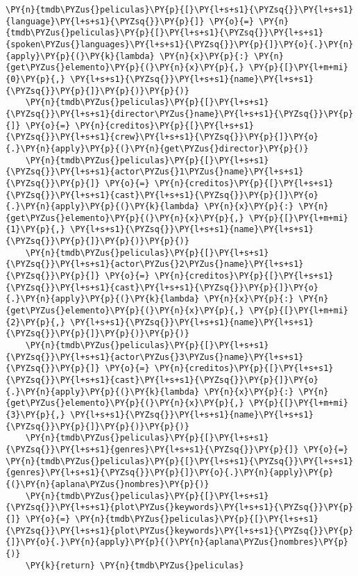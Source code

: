 \begin{tcolorbox}[breakable, size=fbox, boxrule=1pt, pad at break*=1mm,colback=cellbackground, colframe=cellborder]
\begin{Verbatim}[commandchars=\\\{\}]
    \PY{n}{tmdb\PYZus{}peliculas}\PY{p}{[}\PY{l+s+s1}{\PYZsq{}}\PY{l+s+s1}{language}\PY{l+s+s1}{\PYZsq{}}\PY{p}{]} \PY{o}{=} \PY{n}{tmdb\PYZus{}peliculas}\PY{p}{[}\PY{l+s+s1}{\PYZsq{}}\PY{l+s+s1}{spoken\PYZus{}languages}\PY{l+s+s1}{\PYZsq{}}\PY{p}{]}\PY{o}{.}\PY{n}{apply}\PY{p}{(}\PY{k}{lambda} \PY{n}{x}\PY{p}{:} \PY{n}{get\PYZus{}elemento}\PY{p}{(}\PY{n}{x}\PY{p}{,} \PY{p}{[}\PY{l+m+mi}{0}\PY{p}{,} \PY{l+s+s1}{\PYZsq{}}\PY{l+s+s1}{name}\PY{l+s+s1}{\PYZsq{}}\PY{p}{]}\PY{p}{)}\PY{p}{)}
    \PY{n}{tmdb\PYZus{}peliculas}\PY{p}{[}\PY{l+s+s1}{\PYZsq{}}\PY{l+s+s1}{director\PYZus{}name}\PY{l+s+s1}{\PYZsq{}}\PY{p}{]} \PY{o}{=} \PY{n}{creditos}\PY{p}{[}\PY{l+s+s1}{\PYZsq{}}\PY{l+s+s1}{crew}\PY{l+s+s1}{\PYZsq{}}\PY{p}{]}\PY{o}{.}\PY{n}{apply}\PY{p}{(}\PY{n}{get\PYZus{}director}\PY{p}{)}
    \PY{n}{tmdb\PYZus{}peliculas}\PY{p}{[}\PY{l+s+s1}{\PYZsq{}}\PY{l+s+s1}{actor\PYZus{}1\PYZus{}name}\PY{l+s+s1}{\PYZsq{}}\PY{p}{]} \PY{o}{=} \PY{n}{creditos}\PY{p}{[}\PY{l+s+s1}{\PYZsq{}}\PY{l+s+s1}{cast}\PY{l+s+s1}{\PYZsq{}}\PY{p}{]}\PY{o}{.}\PY{n}{apply}\PY{p}{(}\PY{k}{lambda} \PY{n}{x}\PY{p}{:} \PY{n}{get\PYZus{}elemento}\PY{p}{(}\PY{n}{x}\PY{p}{,} \PY{p}{[}\PY{l+m+mi}{1}\PY{p}{,} \PY{l+s+s1}{\PYZsq{}}\PY{l+s+s1}{name}\PY{l+s+s1}{\PYZsq{}}\PY{p}{]}\PY{p}{)}\PY{p}{)}
    \PY{n}{tmdb\PYZus{}peliculas}\PY{p}{[}\PY{l+s+s1}{\PYZsq{}}\PY{l+s+s1}{actor\PYZus{}2\PYZus{}name}\PY{l+s+s1}{\PYZsq{}}\PY{p}{]} \PY{o}{=} \PY{n}{creditos}\PY{p}{[}\PY{l+s+s1}{\PYZsq{}}\PY{l+s+s1}{cast}\PY{l+s+s1}{\PYZsq{}}\PY{p}{]}\PY{o}{.}\PY{n}{apply}\PY{p}{(}\PY{k}{lambda} \PY{n}{x}\PY{p}{:} \PY{n}{get\PYZus{}elemento}\PY{p}{(}\PY{n}{x}\PY{p}{,} \PY{p}{[}\PY{l+m+mi}{2}\PY{p}{,} \PY{l+s+s1}{\PYZsq{}}\PY{l+s+s1}{name}\PY{l+s+s1}{\PYZsq{}}\PY{p}{]}\PY{p}{)}\PY{p}{)}
    \PY{n}{tmdb\PYZus{}peliculas}\PY{p}{[}\PY{l+s+s1}{\PYZsq{}}\PY{l+s+s1}{actor\PYZus{}3\PYZus{}name}\PY{l+s+s1}{\PYZsq{}}\PY{p}{]} \PY{o}{=} \PY{n}{creditos}\PY{p}{[}\PY{l+s+s1}{\PYZsq{}}\PY{l+s+s1}{cast}\PY{l+s+s1}{\PYZsq{}}\PY{p}{]}\PY{o}{.}\PY{n}{apply}\PY{p}{(}\PY{k}{lambda} \PY{n}{x}\PY{p}{:} \PY{n}{get\PYZus{}elemento}\PY{p}{(}\PY{n}{x}\PY{p}{,} \PY{p}{[}\PY{l+m+mi}{3}\PY{p}{,} \PY{l+s+s1}{\PYZsq{}}\PY{l+s+s1}{name}\PY{l+s+s1}{\PYZsq{}}\PY{p}{]}\PY{p}{)}\PY{p}{)}
    \PY{n}{tmdb\PYZus{}peliculas}\PY{p}{[}\PY{l+s+s1}{\PYZsq{}}\PY{l+s+s1}{genres}\PY{l+s+s1}{\PYZsq{}}\PY{p}{]} \PY{o}{=} \PY{n}{tmdb\PYZus{}peliculas}\PY{p}{[}\PY{l+s+s1}{\PYZsq{}}\PY{l+s+s1}{genres}\PY{l+s+s1}{\PYZsq{}}\PY{p}{]}\PY{o}{.}\PY{n}{apply}\PY{p}{(}\PY{n}{aplana\PYZus{}nombres}\PY{p}{)}
    \PY{n}{tmdb\PYZus{}peliculas}\PY{p}{[}\PY{l+s+s1}{\PYZsq{}}\PY{l+s+s1}{plot\PYZus{}keywords}\PY{l+s+s1}{\PYZsq{}}\PY{p}{]} \PY{o}{=} \PY{n}{tmdb\PYZus{}peliculas}\PY{p}{[}\PY{l+s+s1}{\PYZsq{}}\PY{l+s+s1}{plot\PYZus{}keywords}\PY{l+s+s1}{\PYZsq{}}\PY{p}{]}\PY{o}{.}\PY{n}{apply}\PY{p}{(}\PY{n}{aplana\PYZus{}nombres}\PY{p}{)}
    \PY{k}{return} \PY{n}{tmdb\PYZus{}peliculas}
\end{Verbatim}
\end{tcolorbox}

